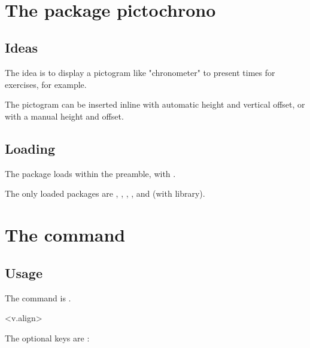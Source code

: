 \documentclass[english,11pt,a4paper]{article}
\begin{document}
\vfill~

\pagebreak

\section{The package pictochrono}

\subsection{Ideas}

The idea is to display a pictogram like "chronometer" to present times for exercises, for example.

The pictogram can be inserted inline with automatic height and vertical offset, or with a manual height and offset.

\subsection{Loading}

The package loads within the preamble, with .

The only loaded packages are , , , ,  and  (with  library).

\begin{codehigh}[language=latex/latex2,style/main=cyan!10,style/code=cyan!10]
\usepackage{pictochrono}
\end{codehigh}

\section{The command}

\subsection{Usage}

The command is .

\begin{codehigh}[language=latex/latex2,style/main=cyan!10,style/code=cyan!10]
<v.align>
\end{codehigh}

\medskip

The optional keys are :
\end{document}
